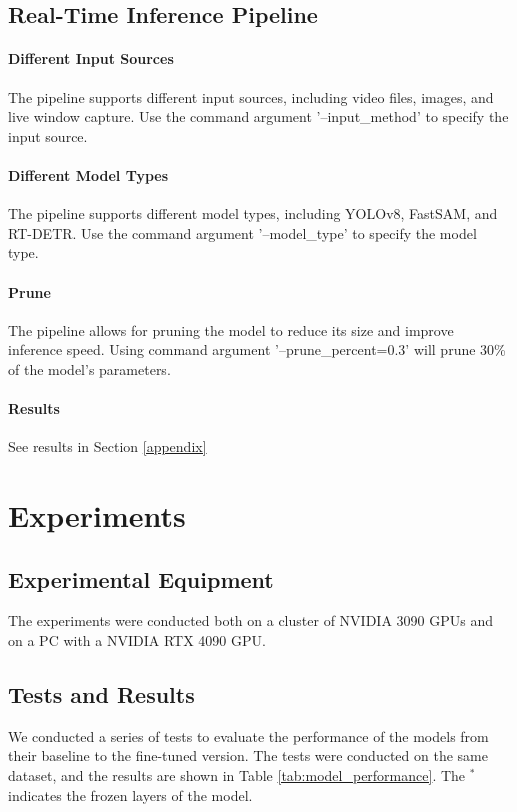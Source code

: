 \documentclass{article}
\begin{document}
\subsection{Real-Time Inference Pipeline}

\paragraph{Different Input Sources} The pipeline supports different input sources, including video files, images, and live window capture. Use the command argument '--input\_method' to specify the input source. 

\paragraph{Different Model Types} The pipeline supports different model types, including YOLOv8, FastSAM, and RT-DETR. Use the command argument '--model\_type' to specify the model type.

\paragraph{Prune} The pipeline allows for pruning the model to reduce its size and improve inference speed. Using command argument '--prune\_percent=0.3' will prune 30\% of the model's parameters.

\paragraph{Results} See results in Section \ref{appendix}

\section{Experiments}
\label{experiments}

\subsection{Experimental Equipment}

The experiments were conducted both on a cluster of NVIDIA 3090 GPUs and on a PC with a NVIDIA RTX 4090 GPU. 

\subsection{Tests and Results}

We conducted a series of tests to evaluate the performance of the models from their baseline to the fine-tuned version. The tests were conducted on the same dataset, and the results are shown in Table \ref{tab:model_performance}. The $^*$ indicates the frozen layers of the model. 
\end{document}
